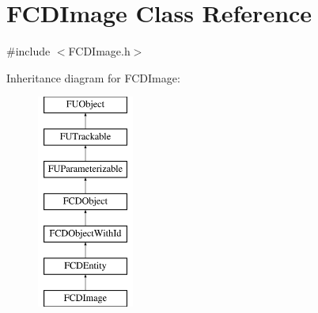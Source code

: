 \hypertarget{classFCDImage}{
\section{FCDImage Class Reference}
\label{classFCDImage}
}


{\ttfamily \#include $<$FCDImage.h$>$}

Inheritance diagram for FCDImage:\begin{figure}[H]
\begin{center}
\leavevmode
\includegraphics[height=7.000000cm]{classFCDImage}
\end{center}
\end{figure}
